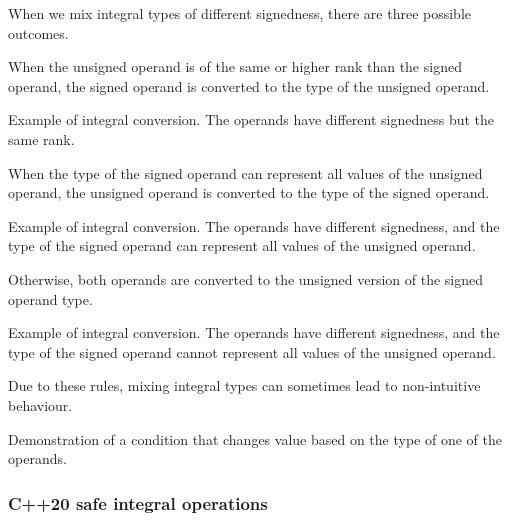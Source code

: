 When we mix integral types of different signedness, there are three possible outcomes.

When the unsigned operand is of the same or higher rank than the signed operand, the signed operand is converted to the type of the unsigned operand.

\begin{codebox}[]{\href{https://compiler-explorer.com/z/q988MTKor}{\ExternalLink}}
\footnotesize Example of integral conversion. The operands have different signedness but the same rank.
\tcblower
{}
\end{codebox}

When the type of the signed operand can represent all values of the unsigned operand, the unsigned operand is converted to the type of the signed operand.

\begin{codebox}[]{\href{https://compiler-explorer.com/z/q988MTKor}{\ExternalLink}}
\footnotesize Example of integral conversion. The operands have different signedness, and the type of the signed operand can represent all values of the unsigned operand.
\tcblower
{}
\end{codebox}

Otherwise, both operands are converted to the unsigned version of the signed operand type.

\begin{codebox}[]{\href{https://compiler-explorer.com/z/4hxMGd7Y8}{\ExternalLink}}
\footnotesize Example of integral conversion. The operands have different signedness, and the type of the signed operand cannot represent all values of the unsigned operand.
\tcblower
{}
\end{codebox}

Due to these rules, mixing integral types can sometimes lead to non-intuitive behaviour.

\begin{codebox}[]{\href{https://compiler-explorer.com/z/c77aKGGaW}{\ExternalLink}}
\footnotesize Demonstration of a condition that changes value based on the type of one of the operands.
\tcblower
{}
\end{codebox}

\subsubsection{C++20 safe integral operations}

